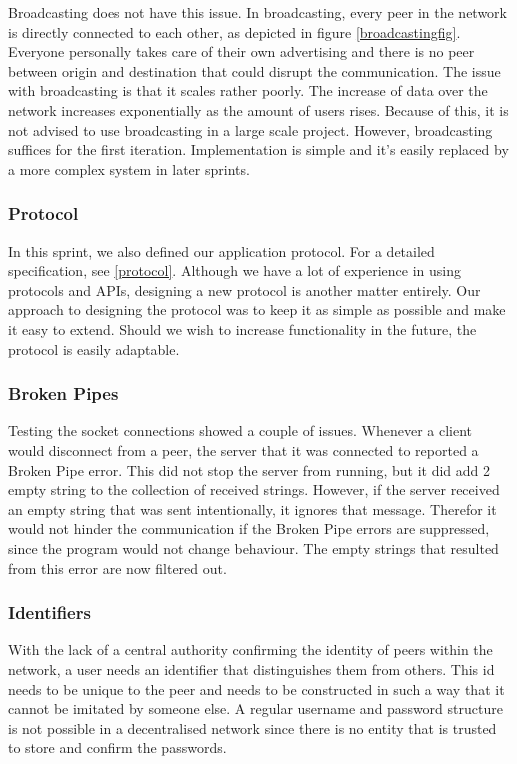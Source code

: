 Broadcasting does not have this issue.
In broadcasting, every peer in the network is directly connected to each other, as depicted in figure \ref{broadcastingfig}.
Everyone personally takes care of their own advertising and there is no peer between origin and destination that could disrupt the communication.
The issue with broadcasting is that it scales rather poorly.
The increase of data over the network increases exponentially as the amount of users rises.
Because of this, it is not advised to use broadcasting in a large scale project.
However, broadcasting suffices for the first iteration.
Implementation is simple and it's easily replaced by a more complex system in later sprints.

\subsubsection{Protocol}
In this sprint, we also defined our application protocol.
For a detailed specification, see \ref{protocol}.
Although we have a lot of experience in using protocols and APIs, designing a new protocol is another matter entirely.
Our approach to designing the protocol was to keep it as simple as possible and make it easy to extend.
Should we wish to increase functionality in the future, the protocol is easily adaptable.

\subsubsection{Broken Pipes}
Testing the socket connections showed a couple of issues.
Whenever a client would disconnect from a peer, the server that it was connected to reported a Broken Pipe error.
This did not stop the server from running, but it did add 2 empty string to the collection of received strings.
However, if the server received an empty string that was sent intentionally, it ignores that message.
Therefor it would not hinder the communication if the Broken Pipe errors are suppressed, since the program would not change behaviour.
The empty strings that resulted from this error are now filtered out.

\subsubsection{Identifiers}
\label{sprint1:identifiers}
With the lack of a central authority confirming the identity of peers within the network, a user needs an identifier that distinguishes them from others.
This id needs to be unique to the peer and needs to be constructed in such a way that it cannot be imitated by someone else.
A regular username and password structure is not possible in a decentralised network since there is no entity that is trusted to store and confirm the passwords.

